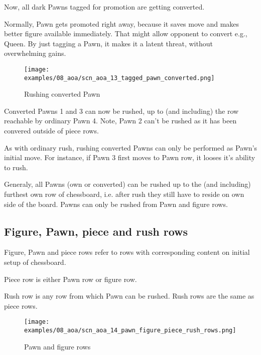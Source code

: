 Now, all dark Pawns tagged for promotion are getting converted.

Normally, Pawn gets promoted right away, because it saves move and makes better
figure available immediately. That might allow opponent to convert e.g., Queen.
By just tagging a Pawn, it makes it a latent threat, without overwhelming gains.

\clearpage %

\noindent
\begin{figure}[h]
\texttt{[image: examples/08\_aoa/scn\_aoa\_13\_tagged\_pawn\_converted.png]}
\caption{Rushing converted Pawn}
\label{fig:scn_aoa_13_tagged_pawn_converted}
\end{figure}

Converted Pawns 1 and 3 can now be rushed, up to (and including) the row
reachable by ordinary Pawn 4. Note, Pawn 2 can't be rushed as it has been
convered outside of piece rows.

As with ordinary rush, rushing converted Pawns can only be performed as Pawn's
initial move. For instance, if Pawn 3 first moves to Pawn row, it looses it's
ability to rush.

Generaly, all Pawns (own or converted) can be rushed up to the (and including)
furthest own row of chessboard, i.e. after rush they still have to reside on
own side of the board. Pawns can only be rushed from Pawn and figure rows.

\subsection*{Figure, Pawn, piece and rush rows}

Figure, Pawn and piece rows refer to rows with corresponding content on initial
setup of chessboard.

Piece row is either Pawn row or figure row.

Rush row is any row from which Pawn can be rushed. Rush rows are the same as
piece rows.

\clearpage %

\noindent
\begin{figure}[h]
\texttt{[image: examples/08\_aoa/scn\_aoa\_14\_pawn\_figure\_piece\_rush\_rows.png]}
\caption{Pawn and figure rows}
\label{fig:scn_aoa_14_pawn_figure_piece_rush_rows}
\end{figure}

